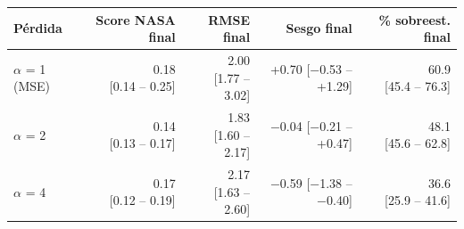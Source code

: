 \setlength{\tabcolsep}{4pt}
\begin{tabular}{lrrrr}
\toprule
\textbf{Pérdida} & \textbf{Score NASA final} & \textbf{RMSE final} & \textbf{Sesgo final} & \textbf{\% sobreest. final} \\
\midrule
$\alpha$ = 1 (MSE) & \shortstack[r]{0.18\\{}[0.14 – 0.25]} & \shortstack[r]{2.00\\{}[1.77 – 3.02]} & \shortstack[r]{+0.70\\{}[$-$0.53 – +1.29]} & \shortstack[r]{60.9\\{}[45.4 – 76.3]} \\
$\alpha$ = 2 & \shortstack[r]{0.14\\{}[0.13 – 0.17]} & \shortstack[r]{1.83\\{}[1.60 – 2.17]} & \shortstack[r]{$-$0.04\\{}[$-$0.21 – +0.47]} & \shortstack[r]{48.1\\{}[45.6 – 62.8]} \\
$\alpha$ = 4 & \shortstack[r]{0.17\\{}[0.12 – 0.19]} & \shortstack[r]{2.17\\{}[1.63 – 2.60]} & \shortstack[r]{$-$0.59\\{}[$-$1.38 – $-$0.40]} & \shortstack[r]{36.6\\{}[25.9 – 41.6]} \\
\bottomrule
\end{tabular}

